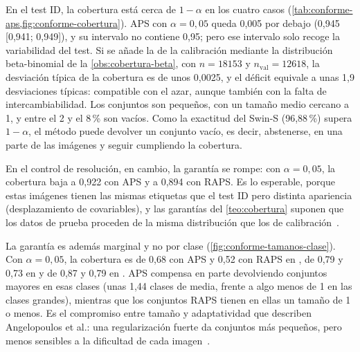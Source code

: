 En el test ID, la cobertura está cerca de $1-\alpha$ en los cuatro casos
(\cref{tab:conforme-aps,fig:conforme-cobertura}). APS con $\alpha = 0{,}05$ queda
0,005 por debajo (0,945 [0,941; 0,949]), y su intervalo no contiene 0,95; pero ese
intervalo solo recoge la variabilidad del test. Si se añade la de la calibración
mediante la distribución beta-binomial de la \cref{obs:cobertura-beta}, con
$n = \num{18153}$ y $n_{\mathrm{val}} = \num{12618}$, la desviación típica de la
cobertura es de unos 0,0025, y el déficit equivale a unas 1,9 desviaciones
típicas: compatible con el azar, aunque también con la falta de
intercambiabilidad. Los conjuntos son pequeños, con un tamaño medio cercano a 1,
y entre el 2 y el 8\,\% son vacíos. Como la exactitud del Swin-S (96,88\,\%)
supera $1-\alpha$, el método puede devolver un conjunto vacío, es decir,
abstenerse, en una parte de las imágenes y seguir cumpliendo la cobertura.

En el control de resolución, en cambio, la garantía se rompe: con $\alpha = 0{,}05$,
la cobertura baja a 0,922 con APS y a 0,894 con RAPS. Es lo esperable, porque
estas imágenes tienen las mismas etiquetas que el test ID pero distinta apariencia
(desplazamiento de covariables), y las garantías del \cref{teo:cobertura} suponen
que los datos de prueba proceden de la misma distribución que los de
calibración~\cite{angelopoulos2021}.

La garantía es además marginal y no por clase (\cref{fig:conforme-tamanos-clase}).
Con $\alpha = 0{,}05$, la cobertura es de 0,68 con APS y 0,52 con RAPS en
, de 0,79 y 0,73 en
 y de 0,87 y 0,79 en .
APS compensa en parte devolviendo conjuntos mayores en esas clases (unas 1,44
clases de media, frente a algo menos de 1 en las clases grandes), mientras que los
conjuntos RAPS tienen en ellas un tamaño de 1 o menos. Es el compromiso entre
tamaño y adaptatividad que describen Angelopoulos et al.: una regularización
fuerte da conjuntos más pequeños, pero menos sensibles a la dificultad de cada
imagen~\cite{angelopoulos2021raps}.

